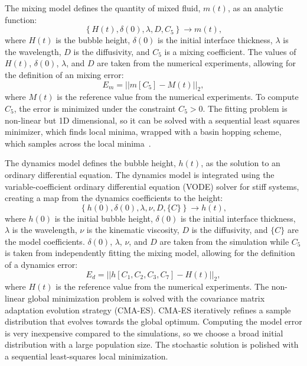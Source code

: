 The mixing model defines the quantity of mixed fluid, $m(t)$, as an analytic function:
\begin{equation}
\left\{H(t), \delta(0), \lambda, D, C_5\right\} \rightarrow m(t),
\end{equation}
where $H(t)$ is the bubble height, 
$\delta(0)$ is the initial interface thickness,
$\lambda$ is the wavelength,
$D$ is the diffusivity, and 
$C_5$ is a mixing coefficient.
The values of $H(t)$, $\delta(0)$, $\lambda$, and $D$ are taken from the numerical experiments, allowing for the definition of an mixing error:
\begin{equation}
E_m = \left|\left|m\left[C_5\right] - M(t) \right| \right|_2,
\end{equation}
where $M(t)$ is the reference value from the numerical experiments.
To compute $C_5$, the error is minimized under the constraint $C_5 > 0$.
The fitting problem is non-linear but 1D dimensional, so it can be solved with a sequential least squares minimizer, which finds local minima, wrapped with a basin hopping scheme, which samples across the local minima~\cite{wales1997global}.

The dynamics model defines the bubble height, $h(t)$, as the solution to an ordinary differential equation.
The dynamics model is integrated using the variable-coefficient ordinary differential equation (VODE) solver for stiff systems, creating a map from the dynamics coefficients to the height:
\begin{equation}
\left\{h(0), \delta(0), \lambda, \nu, D, \{C\}\right\} \rightarrow h(t),
\end{equation}
where $h(0)$ is the initial bubble height,
$\delta(0)$ is the initial interface thickness,
$\lambda$ is the wavelength,
$\nu$ is the kinematic viscosity,
$D$ is the diffusivity, and
$\{C\}$ are the model coefficients.
$\delta(0)$, $\lambda$, $\nu$, and $D$ are taken from the simulation while $C_5$ is taken from independently fitting the mixing model, allowing for the definition of a dynamics error:
\begin{equation}
E_d = \left| \left| h\left[C_1, C_2, C_3, C_7\right] - H(t)\right| \right|_2,
\end{equation}
where $H(t)$ is the reference value from the numerical experiments.
The non-linear global minimization problem is solved with the covariance matrix adaptation evolution strategy (CMA-ES).
CMA-ES iteratively refines a sample distribution that evolves towards the global optimum.
Computing the model error is very inexpensive compared to the simulations, so we choose a broad initial distribution with a large population size.
The stochastic solution is polished with a sequential least-squares local minimization.


